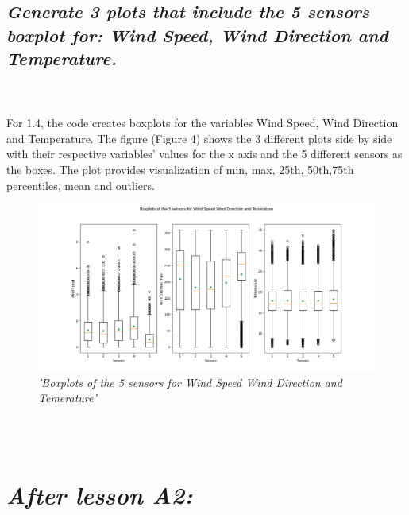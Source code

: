 \documentclass[a4paper,12pt]{article} %
\begin{document}
\subsection{\it Generate 3 plots that include the 5 sensors boxplot for: Wind Speed, Wind Direction and Temperature.}
\\\\
For 1.4, the code creates boxplots for the 
variables Wind Speed, Wind Direction and Temperature. 
The figure (Figure 4) shows the 3 different plots side by side 
with their respective variables’ values for the x axis and the 5 
different sensors as the boxes. The plot provides visualization 
of min, max, 25th, 50th,75th percentiles, mean and outliers.
\\
\begin{figure}[H]
\centering
\includegraphics[width=\textwidth]{Graphs/Boxplots_of_the_5_sensors_for_Temerature,_Wind_Speed_and_Wind_Direction.png}
\caption{\it'Boxplots of the 5 sensors for Wind Speed Wind Direction and Temerature'}
\end{figure}
\\\\
\section{\it After lesson A2:}
\end{document}
